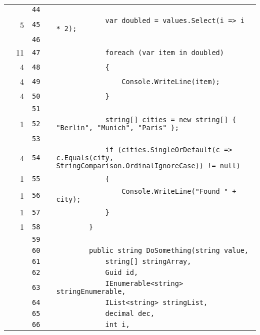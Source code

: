 \documentclass[a4paper,landscape,10pt]{article}
\begin{document}
\begin{longtable}[l]{lrrll}
\cellcolor{gray} &  & \verb~44~ & & \verb~~\\
\cellcolor{green} & 5 & \verb~45~ & & \verb~            var doubled = values.Select(i => i * 2);~\\
\cellcolor{gray} &  & \verb~46~ & & \verb~~\\
\cellcolor{green} & 11 & \verb~47~ & & \verb~            foreach (var item in doubled)~\\
\cellcolor{green} & 4 & \verb~48~ & & \verb~            {~\\
\cellcolor{green} & 4 & \verb~49~ & & \verb~                Console.WriteLine(item);~\\
\cellcolor{green} & 4 & \verb~50~ & & \verb~            }~\\
\cellcolor{gray} &  & \verb~51~ & & \verb~~\\
\cellcolor{green} & 1 & \verb~52~ & & \verb~            string[] cities = new string[] { "Berlin", "Munich", "Paris" };~\\
\cellcolor{gray} &  & \verb~53~ & & \verb~~\\
\cellcolor{orange} & 4 & \verb~54~ & & \verb~            if (cities.SingleOrDefault(c => c.Equals(city, StringComparison.OrdinalIgnoreCase)) != null)~\\
\cellcolor{green} & 1 & \verb~55~ & & \verb~            {~\\
\cellcolor{green} & 1 & \verb~56~ & & \verb~                Console.WriteLine("Found " + city);~\\
\cellcolor{green} & 1 & \verb~57~ & & \verb~            }~\\
\cellcolor{green} & 1 & \verb~58~ & & \verb~        }~\\
\cellcolor{gray} &  & \verb~59~ & & \verb~~\\
\cellcolor{gray} &  & \verb~60~ & & \verb~        public string DoSomething(string value,~\\
\cellcolor{gray} &  & \verb~61~ & & \verb~            string[] stringArray,~\\
\cellcolor{gray} &  & \verb~62~ & & \verb~            Guid id,~\\
\cellcolor{gray} &  & \verb~63~ & & \verb~            IEnumerable<string> stringEnumerable,~\\
\cellcolor{gray} &  & \verb~64~ & & \verb~            IList<string> stringList,~\\
\cellcolor{gray} &  & \verb~65~ & & \verb~            decimal dec,~\\
\cellcolor{gray} &  & \verb~66~ & & \verb~            int i,~\\

\end{longtable}
\end{document}
